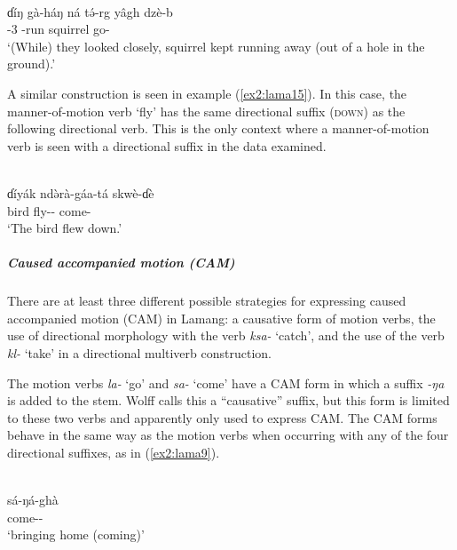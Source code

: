 \ea\label{ex2:lama14}
 \\
\gll 
ɗíŋ gà-háŋ ná tə́-rg yâgh dzè-b	\\
 -3  -run squirrel go-	\\
\glt `(While) they looked closely, squirrel kept running away (out of a hole in the ground).'
\z

A similar construction is seen in example (\ref{ex2:lama15}). In this case, the manner-of-motion verb `fly' has the same directional suffix (\textsc{down}) as the following directional verb. This is the only context where a manner-of-motion verb is seen with a directional suffix in the data examined.

\ea\label{ex2:lama15}
 \\
\gll ɗíyák ndə̀rà-gáa-tá skwè-ɗè	\\
bird fly-- come-	\\
\glt `The bird flew down.'
\z 


\subparagraph{Caused accompanied motion (CAM)}
\largerpage[2]

There are at least three different possible strategies for expressing caused accompanied motion (CAM) in Lamang: a causative form of motion verbs, the use of directional morphology with the verb \textit{ksa-} `catch', and the use of the verb \textit{kl-} ‘take’ in a directional multiverb construction. 

The motion verbs  \textit{la-} `go' and \textit{sa-} `come' have a CAM form in which a suffix \textit{-ŋa} is added to the stem. Wolff calls this a ``causative'' suffix, but this form is limited to these two verbs and apparently only used to express CAM. The CAM forms behave in the same way as the motion verbs when occurring with any of the four directional suffixes, as in (\ref{ex2:lama9}). 

\ea\label{ex2:lama9}
 \\

\ea
\gll 
sá-ŋá-ghà \\
come-- \\
\glt `bringing home (coming)'

